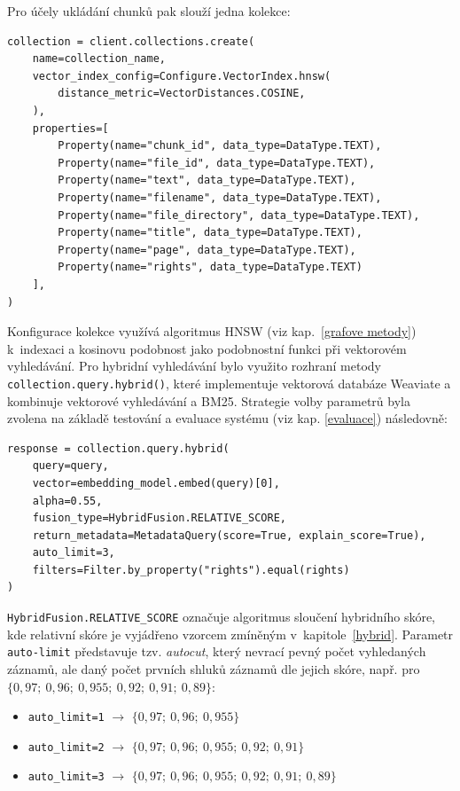 Pro účely ukládání chunků pak slouží jedna kolekce:
\begin{verbatim}
collection = client.collections.create(
    name=collection_name,
    vector_index_config=Configure.VectorIndex.hnsw(
        distance_metric=VectorDistances.COSINE,
    ),
    properties=[
        Property(name="chunk_id", data_type=DataType.TEXT),
        Property(name="file_id", data_type=DataType.TEXT),
        Property(name="text", data_type=DataType.TEXT),
        Property(name="filename", data_type=DataType.TEXT),
        Property(name="file_directory", data_type=DataType.TEXT),
        Property(name="title", data_type=DataType.TEXT),
        Property(name="page", data_type=DataType.TEXT),
        Property(name="rights", data_type=DataType.TEXT)
    ],
)
\end{verbatim}
Konfigurace kolekce využívá algoritmus HNSW (viz kap.~\ref{grafove metody}) k~indexaci a kosinovu podobnost jako podobnostní funkci při vektorovém vyhledávání. Pro hybridní vyhledávání bylo využito rozhraní metody \texttt{collection.query.hybrid()}, které implementuje vektorová databáze Weaviate a kombinuje vektorové vyhledávání a BM25. Strategie volby parametrů byla zvolena na základě testování a evaluace systému (viz kap. \ref{evaluace}) následovně:
\begin{verbatim}
response = collection.query.hybrid(
    query=query,
    vector=embedding_model.embed(query)[0],
    alpha=0.55,
    fusion_type=HybridFusion.RELATIVE_SCORE,
    return_metadata=MetadataQuery(score=True, explain_score=True),
    auto_limit=3,
    filters=Filter.by_property("rights").equal(rights)
)
\end{verbatim}
\texttt{HybridFusion.RELATIVE\_SCORE} označuje algoritmus sloučení hybridního skóre, kde relativní skóre je vyjádřeno vzorcem zmíněným v~kapitole~\ref{hybrid}. Parametr \texttt{auto-limit} představuje tzv. \textit{autocut}, který nevrací pevný počet vyhledaných záznamů, ale daný počet prvních shluků záznamů dle jejich skóre, např. pro $\{0{,}97;\ 0{,}96;\ 0{,}955;\ 0{,}92;\ 0{,}91;\ 0{,}89\}$: 
\begin{itemize}
  \item \texttt{auto\_limit=1} $\rightarrow$ $\{0{,}97;\ 0{,}96;\ 0{,}955\}$
  \item \texttt{auto\_limit=2} $\rightarrow$ $\{0{,}97;\ 0{,}96;\ 0{,}955;\ 0{,}92;\ 0{,}91\}$
  \item \texttt{auto\_limit=3} $\rightarrow$ $\{0{,}97;\ 0{,}96;\ 0{,}955;\ 0{,}92;\ 0{,}91;\ 0{,}89\}$
\end{itemize}

